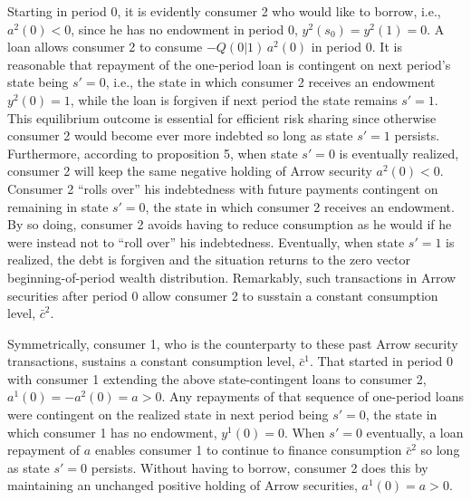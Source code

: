 Starting in period 0, it is evidently consumer 2
who would like to borrow, i.e.,  $a^2(0)<0$, since he 
has no endowment in period 0, $y^2(s_0)=y^2(1)=0$.
A loan allows consumer 2 to consume
$-Q(0 | 1)\, a^2(0)$ in period 0. It is reasonable 
that  repayment of the one-period loan is
contingent on next period's state being
$s'=0$, i.e., the state in which consumer 2 
receives an endowment $y^2(0)=1$, while the
loan is forgiven if next period the  state remains  $s'=1$. This equilibrium outcome is 
essential for  efficient risk sharing since
otherwise consumer 2 would become ever more
indebted so long as state $s'=1$ persists.
Furthermore, according to proposition 5, 
when state $s'=0$ is eventually realized, 
consumer 2 will keep the same negative 
holding of Arrow security $a^2(0)<0$.
Consumer 2  ``rolls over''
his indebtedness with future payments
contingent on remaining in state $s'=0$, the state
in which consumer 2 receives an endowment. By 
so doing, consumer 2 avoids having to reduce
consumption as he would  if he were  instead not to  ``roll over'' 
his indebtedness. Eventually, when state $s'=1$ 
is realized, the debt is forgiven and the 
situation returns  to the zero vector beginning-of-period 
wealth distribution. Remarkably, such 
transactions in Arrow securities after period 0 
allow consumer 2 to susstain a constant 
consumption level, $\bar c^2$.

Symmetrically,  consumer 1, who is the counterparty to these past Arrow
security transactions,  sustains  a constant consumption level,
$\bar c^1$. That started in period 0 with
consumer 1 extending the above state-contingent 
loans to consumer 2, $a^1(0)=-a^2(0)=a >0$.
Any repayments of  that sequence of 
one-period loans were contingent on the
realized state in next period being $s'=0$, the
state in which consumer 1 has no endowment,
$y^1(0)=0$. When $s' = 0$ eventually, 
a loan repayment of $a$ enables consumer 1 
to continue to finance consumption 
$\bar c^2$ so long as state $s'=0$ persists. 
Without having to borrow, consumer 2 does this 
by maintaining an unchanged positive holding of 
Arrow securities, $a^1(0)=a>0$. 

